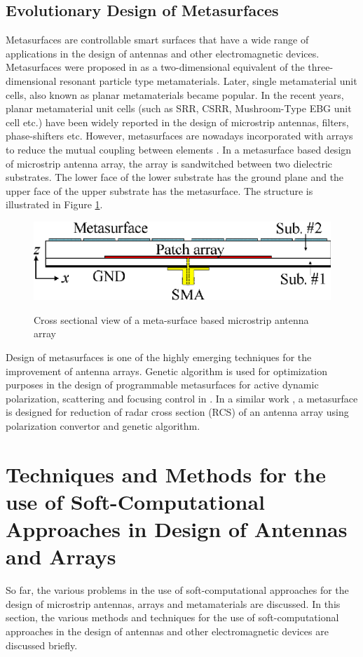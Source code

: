 \subsection{Evolutionary Design of Metasurfaces}
Metasurfaces are controllable smart surfaces that have a wide range of applications in the design of antennas and other electromagnetic devices. Metasurfaces were proposed in \cite{metasurface1} as a two-dimensional equivalent of the three-dimensional resonant particle type metamaterials. Later, single metamaterial unit cells, also known as planar metamaterials became popular. In the recent years, planar metamaterial unit cells (such as SRR, CSRR, Mushroom-Type EBG unit cell etc.) have been widely reported in the design of microstrip antennas, filters, phase-shifters etc. However, metasurfaces are nowadays incorporated with arrays to reduce the mutual coupling between elements \cite{metasurface2}. In a metasurface based design of microstrip antenna array, the array is sandwitched between two dielectric substrates. The lower face of the lower substrate has the ground plane and the upper face of the upper substrate has the metasurface. The structure is illustrated in Figure \ref{fig_2_6}.
 
\begin{figure}
  \centering
  \includegraphics[width=0.6\linewidth]{fig_2_6.eps}\\
  \caption{Cross sectional view of a meta-surface based microstrip antenna array \cite{metasurface2}} \label{fig_2_6}
\end{figure}

Design of metasurfaces is one of the highly emerging techniques for the improvement of antenna arrays. Genetic algorithm is used for optimization purposes in the design of programmable metasurfaces for active dynamic polarization, scattering and focusing control in \cite{softCompMeta}. In a similar work \cite{uwb_rcs}, a metasurface is designed for reduction of radar cross section (RCS) of an antenna array using polarization convertor and genetic algorithm. 

\section{Techniques and Methods for the use of Soft-Computational Approaches in Design of Antennas and Arrays} \label{c2sec_methods}
So far, the various problems in the use of soft-computational approaches for the design of microstrip antennas, arrays and metamaterials are discussed. In this section, the various methods and techniques for the use of soft-computational approaches in the design of antennas and other electromagnetic devices are discussed briefly.

